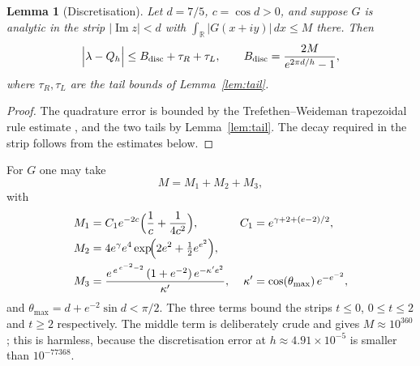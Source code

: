 \documentclass[11pt,a4paper]{article}
\newtheorem{lemma}{Lemma}
\theoremstyle{remark}
\newcommand{\lam}{\lambda}
\newcommand{\R}{\mathbb{R}}
\begin{document}
\begin{lemma}[Discretisation]
\label{lem:disc}
Let $d=7/5$, $c=\cos d>0$, and suppose $G$ is analytic in the strip
$|\operatorname{Im}z|<d$ with
$\int_\R|G(x+iy)|\,dx\le M$ there. Then
\begin{equation}
  \Bigl|\lam-Q_h\Bigr|
  \le B_{\mathrm{disc}}+\tau_R+\tau_L,
  \qquad
  B_{\mathrm{disc}}=\frac{2M}{e^{2\pi d/h}-1},
\end{equation}
where $\tau_R,\tau_L$ are the tail bounds of Lemma~\ref{lem:tail}.
\end{lemma}

\begin{proof}
The quadrature error is bounded by the Trefethen--Weideman trapezoidal
rule estimate \cite[Thm.~5.1]{TW2014}, and the two tails by
Lemma~\ref{lem:tail}. The decay required in the strip follows from the
estimates below.
\end{proof}

For $G$ one may take
\begin{equation}
  M=M_1+M_2+M_3,
  \label{eq:M}
\end{equation}
with
\begin{align}
  M_1&=C_1e^{-2c}\Bigl(\frac1c+\frac1{4c^2}\Bigr),
  &C_1&=e^{\gamma+2+(e-2)/2},\\
  M_2&=4e^{\gamma}e^{4}\exp\!\Bigl(2e^2+\tfrac12e^{e^2}\Bigr),\\
  M_3&=\frac{e^{\,e^{\,e^{-2}-2}}\,(1+e^{-2})\,e^{-\kappa'e^2}}{\kappa'},
  &\kappa'&=\cos(\theta_{\max})\,e^{-e^{-2}},
\end{align}
and $\theta_{\max}=d+e^{-2}\sin d<\pi/2$. The three terms bound the
strips $t\le0$, $0\le t\le2$ and $t\ge2$ respectively. The middle term
is deliberately crude and gives $M\approx10^{360}$; this is harmless,
because the discretisation error at $h\approx4.91\times10^{-5}$ is
smaller than $10^{-77368}$.
\end{document}
